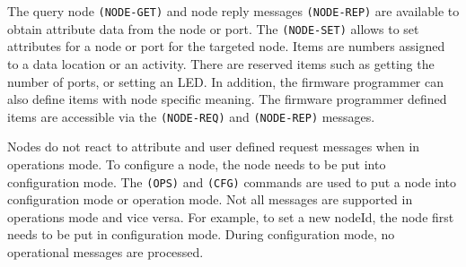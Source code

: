 The query node \texttt{(NODE-GET)} and node reply messages \texttt{(NODE-REP)} are available to obtain attribute data from the node or port. The \texttt{(NODE-SET)} allows to set attributes for a node or port for the targeted node. Items are numbers assigned to a data location or an activity. There are reserved items such as getting the number of ports, or setting an LED. In addition, the firmware programmer can also define items with node specific meaning. The firmware programmer defined items are accessible via the \texttt{(NODE-REQ)} and \texttt{(NODE-REP)} messages.

\begin{table}[ht!]
    \centering 
    \caption{Node and Port Management}
\end{table}

Nodes do not react to attribute and user defined request messages when in operations mode. To configure a node, the node needs to be put into configuration mode. The \texttt{(OPS)} and \texttt{(CFG)} commands are used to put a node into configuration mode or operation mode. Not all messages are supported in operations mode and vice versa. For example, to set a new nodeId, the node first needs to be put in configuration mode. During configuration mode, no operational messages are processed.

\begin{table}[ht!]
    \centering 
    \caption{Operation and Configuration Mode}
\end{table}

